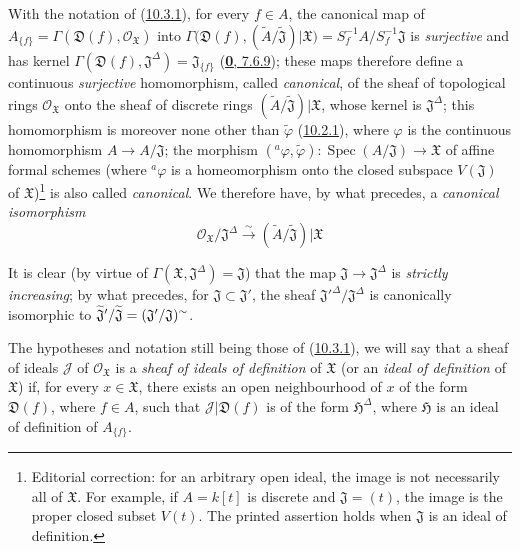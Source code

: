 \begin{env}[10.3.2]
\label{I.10.3.2}
With the notation of (\hyperref[I.10.3.1]{10.3.1}), for every $f\in A$,
the canonical map of
$A_{\{f\}}=\Gamma(\mathfrak{D}(f),\mathscr{O}_{\mathfrak{X}})$ into
$\Gamma\bigl(\mathfrak{D}(f),
(\widetilde{A}/\widetilde{\mathfrak{J}})|\mathfrak{X}\bigr)
=S_f^{-1}A/S_f^{-1}\mathfrak{J}$
is \emph{surjective} and has kernel
$\Gamma(\mathfrak{D}(f),\mathfrak{J}^\Delta)=\mathfrak{J}_{\{f\}}$
(\hyperref[0.7.6.9]{\textbf{0}, 7.6.9}); these maps therefore define a
continuous \emph{surjective} homomorphism, called \emph{canonical}, of the
sheaf of topological rings $\mathscr{O}_{\mathfrak{X}}$ onto the sheaf of
discrete rings
$(\widetilde{A}/\widetilde{\mathfrak{J}})|\mathfrak{X}$, whose kernel is
$\mathfrak{J}^\Delta$; this homomorphism is moreover none other than
$\widetilde{\varphi}$ (\hyperref[I.10.2.1]{10.2.1}), where $\varphi$ is
the continuous homomorphism $A\to A/\mathfrak{J}$; the morphism
$({}^a\varphi,\widetilde{\varphi}):
\operatorname{Spec}(A/\mathfrak{J})\to\mathfrak{X}$ of affine formal
schemes (where ${}^a\varphi$ is a homeomorphism onto the closed subspace $V(\mathfrak{J})$ of $\mathfrak{X}$)\footnote{Editorial correction: for an arbitrary open ideal, the image is not necessarily all of $\mathfrak{X}$. For example, if $A=k[t]$ is discrete and $\mathfrak{J}=(t)$, the image is the proper closed subset $V(t)$. The printed assertion holds when $\mathfrak{J}$ is an ideal of definition.} is also called \emph{canonical}. We therefore have,
by what precedes, a \emph{canonical isomorphism}
\[
  \mathscr{O}_{\mathfrak{X}}/\mathfrak{J}^\Delta
  \xrightarrow{\sim}
  (\widetilde{A}/\widetilde{\mathfrak{J}})|\mathfrak{X}
  \tag{10.3.2.1}\label{I.10.3.2.1}
\]

It is clear (by virtue of
$\Gamma(\mathfrak{X},\mathfrak{J}^\Delta)=\mathfrak{J}$) that
the map $\mathfrak{J}\to\mathfrak{J}^\Delta$ is
\emph{strictly increasing}; by what precedes, for
$\mathfrak{J}\subset\mathfrak{J}'$, the sheaf
${\mathfrak{J}'}^\Delta/\mathfrak{J}^\Delta$ is canonically isomorphic to
$\widetilde{\mathfrak{J}}'/\widetilde{\mathfrak{J}}
=(\mathfrak{J}'/\mathfrak{J})^{\sim}$.
\end{env}

\begin{env}[10.3.3]
\label{I.10.3.3}
The hypotheses and notation still being those of
(\hyperref[I.10.3.1]{10.3.1}), we will say that a sheaf of ideals
$\mathscr{J}$ of $\mathscr{O}_{\mathfrak{X}}$ is a
\emph{sheaf of ideals of definition} of $\mathfrak{X}$ (or an
\emph{ideal of definition} of $\mathfrak{X}$) if, for every
$x\in\mathfrak{X}$, there exists an open neighbourhood of $x$ of the form
$\mathfrak{D}(f)$, where $f\in A$, such that
$\mathscr{J}|\mathfrak{D}(f)$ is of the form $\mathfrak{H}^\Delta$, where
$\mathfrak{H}$ is an ideal of definition of $A_{\{f\}}$.
\end{env}


